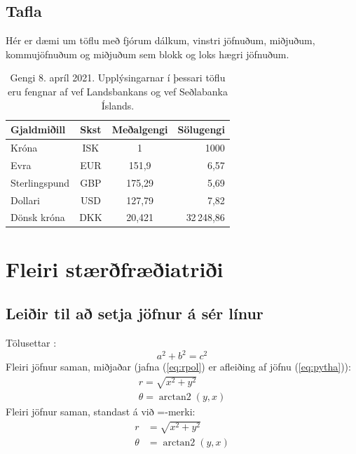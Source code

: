 \documentclass[12pt]{article}    %
\begin{document}
\subsection{Tafla}
Hér er dæmi um töflu með fjórum dálkum, vinstri jöfnuðum, miðjuðum, kommujöfnuðum og miðjuðum sem blokk og loks hægri jöfnuðum.
%
\begin{table}[ht!]  %
    \centering
    \caption{Gengi 8. apríl 2021. Upplýsingarnar í þessari töflu eru fengnar af vef Landsbankans og vef Seðlabanka Íslands.}
    \begin{tabular}{lcS[table-format=3.3]r} %
        \toprule  %
        Gjaldmiðill & Skst & {Meðalgengi} & Sölugengi \\
        \midrule
        Króna         & ISK  & 1    & 1000 \\
        Evra          & EUR  & 151,9  & 6,57 \\
        Sterlingspund & GBP  & 175,29 & 5,69 \\
        Dollari       & USD  & 127,79 & 7,82 \\
        Dönsk króna   & DKK  & 20,421 & 32\,248,86 \\
        \bottomrule
    \end{tabular}
\end{table}
%
\section{Fleiri stærðfræðiatriði}
\subsection{Leiðir til að setja jöfnur á sér línur} 
Tölusettar :
%
\begin{equation} \label{eq:pytha}
    a^2 + b^2 = c^2
\end{equation}
%
Fleiri jöfnur saman, miðjaðar (jafna (\ref{eq:rpol}) er afleiðing af jöfnu (\ref{eq:pytha})):
%
\begin{gather}
    \label{eq:rpol}
    r = \sqrt{x^2 + y^2} \\               %
    \theta = \operatorname{arctan2}(y,x)  %
\end{gather}
%
Fleiri jöfnur saman, standast á við =-merki:
\begin{align*}  %
    r &= \sqrt{x^2 + y^2} \\
    \theta &= \operatorname{arctan2}(y,x)
\end{align*}  %
%
\end{document}
